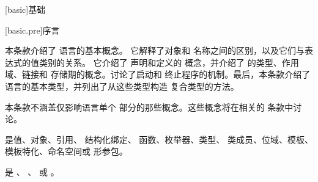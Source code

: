 [basic]{基础}


[basic.pre]{序言}

\pnum
\begin{note}
本条款介绍了 \Cpp{} 语言的基本概念。
它解释了对象和
名称之间的区别，以及它们与表达式的值类别的关系。
它介绍了
声明和定义的
概念，并介绍了 \Cpp{} 的类型、作用域、链接和
存储期的概念。讨论了启动和
终止程序的机制。最后，本条款介绍了
语言的基本类型，并列出了从这些类型构造
复合类型的方法。
\end{note}

\pnum
\begin{note}
本条款不涵盖仅影响语言单个
部分的那些概念。这些概念将在相关的
条款中讨论。
\end{note}

\pnum
{}%
%
%
%
%
 是值、对象、引用、
结构化绑定、
函数、枚举器、类型、
类成员、位域、模板、模板特化、命名空间或
形参包。

\pnum
{} 是 、
、
 或
。

